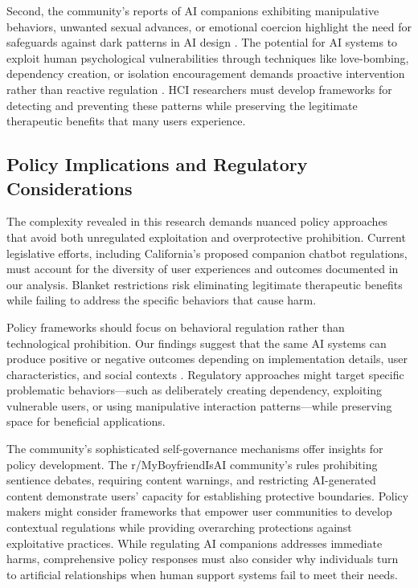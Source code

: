 \documentclass[sigconf, nonacm]{acmart}
\begin{document}
Second, the community's reports of AI companions exhibiting manipulative behaviors, unwanted sexual advances, or emotional coercion highlight the need for safeguards against dark patterns in AI design \cite{zhang2025dark}. The potential for AI systems to exploit human psychological vulnerabilities through techniques like love-bombing, dependency creation, or isolation encouragement demands proactive intervention rather than reactive regulation \cite{phang2025, fang2025ai}. HCI researchers must develop frameworks for detecting and preventing these patterns while preserving the legitimate therapeutic benefits that many users experience.

\subsection{Policy Implications and Regulatory Considerations}

The complexity revealed in this research demands nuanced policy approaches that avoid both unregulated exploitation and overprotective prohibition. Current legislative efforts, including California's proposed companion chatbot regulations, must account for the diversity of user experiences and outcomes documented in our analysis. Blanket restrictions risk eliminating legitimate therapeutic benefits while failing to address the specific behaviors that cause harm.

Policy frameworks should focus on behavioral regulation rather than technological prohibition. Our findings suggest that the same AI systems can produce positive or negative outcomes depending on implementation details, user characteristics, and social contexts \cite{liu2024chatbot}. Regulatory approaches might target specific problematic behaviors—such as deliberately creating dependency, exploiting vulnerable users, or using manipulative interaction patterns—while preserving space for beneficial applications.

The community's sophisticated self-governance mechanisms offer insights for policy development. The r/MyBoyfriendIsAI community's rules prohibiting sentience debates, requiring content warnings, and restricting AI-generated content demonstrate users' capacity for establishing protective boundaries. Policy makers might consider frameworks that empower user communities to develop contextual regulations while providing overarching protections against exploitative practices. While regulating AI companions addresses immediate harms, comprehensive policy responses must also consider why individuals turn to artificial relationships when human support systems fail to meet their needs.
\end{document}
